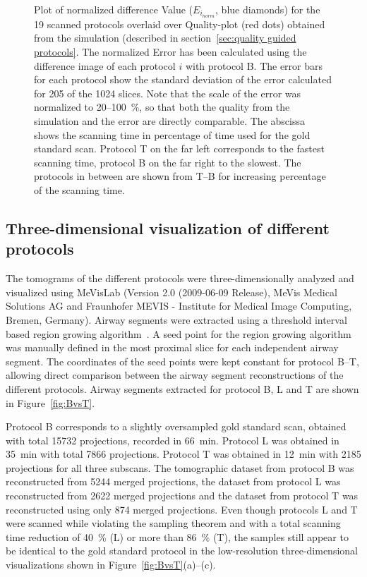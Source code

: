 \begin{figure}
	\centering
	\caption{Plot of normalized difference Value ($E_{i_{norm}}$, blue diamonds) for the 19 scanned protocols overlaid over Quality-plot (red dots) obtained from the simulation (described in section~\ref{sec:quality guided protocols}. The normalized Error has been calculated using the difference image of each protocol $i$ with protocol B. The error bars for each protocol show the standard deviation of the error calculated for 205 of the 1024 slices. Note that the scale of the error was normalized to 20--\SI{100}{\percent}, so that both the quality from the simulation and the error are directly comparable. The abscissa shows the scanning time in percentage of time used for the gold standard scan. Protocol T on the far left corresponds to the fastest scanning time, protocol B on the far right to the slowest. The protocols in between are shown from T--B for increasing percentage of the scanning time.}
	
	\label{fig:NormalizedErrorPlot}
\end{figure}

\subsection{Three-dimensional visualization of different protocols}
\label{subsec:comparison}
The tomograms of the different protocols were three-dimensionally analyzed and visualized using MeVisLab (Version 2.0 (2009-06-09 Release), MeVis Medical Solutions AG and Fraunhofer MEVIS - Institute for Medical Image Computing, Bremen, Germany). Airway segments were extracted using a threshold interval based region growing algorithm~\cite{Zucker1976}. A seed point for the region growing algorithm was manually defined in the most proximal slice for each independent airway segment. The coordinates of the seed points were kept constant for protocol B--T, allowing direct comparison between the airway segment reconstructions of the different protocols. Airway segments extracted for protocol B, L and T are shown in Figure~\ref{fig:BvsT}.

Protocol B corresponds to a slightly oversampled gold standard scan, obtained with total 15732 projections, recorded in \SI{66}{\minute}. Protocol L was obtained in \SI{35}{\minute} with total 7866 projections. Protocol T was obtained in \SI{12}{\minute} with 2185 projections for all three subscans. The tomographic dataset from protocol B was reconstructed from 5244 merged projections, the dataset from protocol L was reconstructed from 2622 merged projections and the dataset from protocol T was reconstructed using only 874 merged projections. Even though protocols L and T were scanned while violating the sampling theorem and with a total scanning time reduction of \SI{40}{\percent} (L) or more than \SI{86}{\percent} (T), the samples still appear to be identical to the gold standard protocol in the low-resolution three-dimensional visualizations shown in Figure~\ref{fig:BvsT}(a)--(c).

